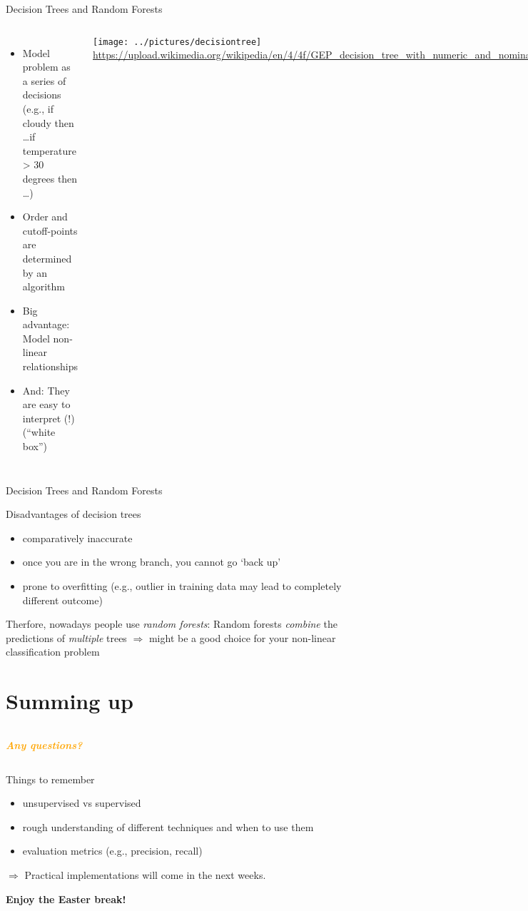 \documentclass[compress]{beamer}
\newcommand{\question}[1]{
	\begin{frame}[plain]
		\begin{columns}
			\column{.3\textwidth}
			\makebox[\columnwidth]{
				\texttt{[image: mannetje.png]}}
			\column{.7\textwidth}
			\large
			\textcolor{orange}{\textbf{\emph{#1}}}
		\end{columns}
\end{frame}}
\begin{document}
\begin{frame}{Decision Trees and Random Forests}
	\begin{columns}
		\begin{itemize}[<+->]
			\item Model problem as a series of decisions (e.g., if cloudy then \ldots if temperature > 30 degrees then \ldots)
			\item Order and cutoff-points are determined by an algorithm
			\item Big advantage: Model non-linear relationships
			\item And: They are easy to interpret (!) (``white box'')
		\end{itemize}
		\texttt{[image: ../pictures/decisiontree]}
		\tiny{\url{https://upload.wikimedia.org/wikipedia/en/4/4f/GEP\_decision\_tree\_with\_numeric\_and\_nominal\_attributes.png}}
	\end{columns}
\end{frame}
\begin{frame}{Decision Trees and Random Forests}
	\begin{block}{Disadvantages of decision trees}
		\begin{itemize}
			\item comparatively inaccurate
			\item once you are in the wrong branch, you cannot go `back up'
			\item prone to overfitting (e.g., outlier in training data may lead to completely different outcome)
		\end{itemize}
	\end{block}
	\pause
	Therfore, nowadays people use \emph{random forests}: Random forests \emph{combine} the predictions of \emph{multiple} trees
	$\Rightarrow$ might be a good choice for your non-linear classification problem
\end{frame}









\section{Summing up}

\question{Any questions?}

\begin{frame}{Things to remember}
\begin{itemize}
	\item unsupervised vs supervised
	\item rough understanding of different techniques and when to use them
	\item evaluation metrics (e.g., precision, recall)
\end{itemize}
$\Rightarrow$ Practical implementations will come in the next weeks.

\textbf{Enjoy the Easter break!}
\end{frame}

\begin{frame}[plain]
	\printbibliography
\end{frame}
\end{document}
